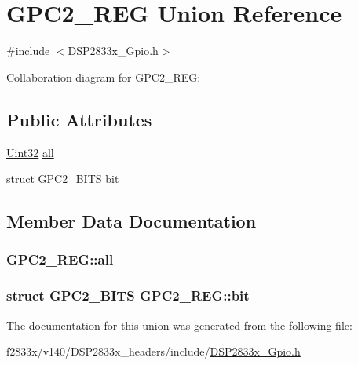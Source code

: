 \hypertarget{union_g_p_c2___r_e_g}{}\section{G\+P\+C2\+\_\+\+R\+E\+G Union Reference}
\label{union_g_p_c2___r_e_g}


{\ttfamily \#include $<$D\+S\+P2833x\+\_\+\+Gpio.\+h$>$}



Collaboration diagram for G\+P\+C2\+\_\+\+R\+E\+G\+:
\subsection*{Public Attributes}
\begin{DoxyCompactItemize}
\item 
\hyperlink{_d_s_p2833x___device_8h_aba99025e657f892beb7ff31cecf64653}{Uint32} \hyperlink{union_g_p_c2___r_e_g_a892b91ceac3719bb198675c5df2e5744}{all}
\item 
struct \hyperlink{struct_g_p_c2___b_i_t_s}{G\+P\+C2\+\_\+\+B\+I\+T\+S} \hyperlink{union_g_p_c2___r_e_g_a992143a1bd1a2b1dad2f92c91944fb8a}{bit}
\end{DoxyCompactItemize}


\subsection{Member Data Documentation}
\hypertarget{union_g_p_c2___r_e_g_a892b91ceac3719bb198675c5df2e5744}{}
\subsubsection[{all}]{ G\+P\+C2\+\_\+\+R\+E\+G\+::all}\label{union_g_p_c2___r_e_g_a892b91ceac3719bb198675c5df2e5744}
\hypertarget{union_g_p_c2___r_e_g_a992143a1bd1a2b1dad2f92c91944fb8a}{}
\subsubsection[{bit}]{\setlength{\rightskip}{0pt plus 5cm}struct {\bf G\+P\+C2\+\_\+\+B\+I\+T\+S} G\+P\+C2\+\_\+\+R\+E\+G\+::bit}\label{union_g_p_c2___r_e_g_a992143a1bd1a2b1dad2f92c91944fb8a}


The documentation for this union was generated from the following file\+:\begin{DoxyCompactItemize}
\item 
f2833x/v140/\+D\+S\+P2833x\+\_\+headers/include/\hyperlink{_d_s_p2833x___gpio_8h}{D\+S\+P2833x\+\_\+\+Gpio.\+h}\end{DoxyCompactItemize}
